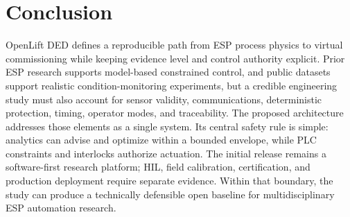 \documentclass[conference]{IEEEtran}
\begin{document}
\section{Conclusion}
OpenLift DED defines a reproducible path from ESP process physics to virtual commissioning while keeping evidence level and control authority explicit. Prior ESP research supports model-based constrained control, and public datasets support realistic condition-monitoring experiments, but a credible engineering study must also account for sensor validity, communications, deterministic protection, timing, operator modes, and traceability. The proposed architecture addresses those elements as a single system. Its central safety rule is simple: analytics can advise and optimize within a bounded envelope, while PLC constraints and interlocks authorize actuation. The initial release remains a software-first research platform; HIL, field calibration, certification, and production deployment require separate evidence. Within that boundary, the study can produce a technically defensible open baseline for multidisciplinary ESP automation research.
\end{document}
